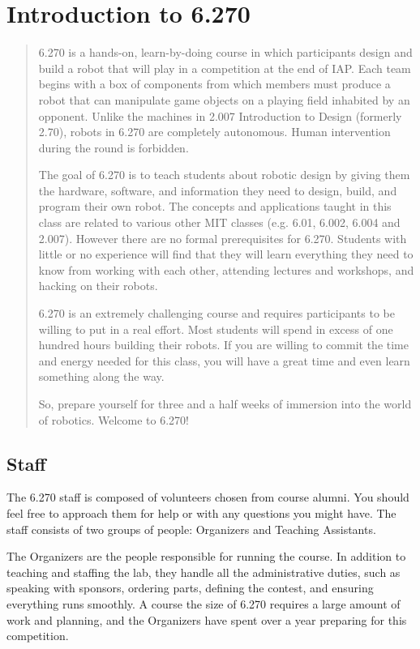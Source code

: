 
\chapter{Introduction to 6.270}
\begin{quote}
6.270 is a hands-on, learn-by-doing course in which participants design and
build a robot that will play in a competition at the end of IAP. Each team
begins with a box of components from which members must produce a robot that can
manipulate game objects on a playing field inhabited by an opponent. Unlike the
machines in 2.007 Introduction to Design (formerly 2.70), robots in 6.270 are
completely autonomous.  Human intervention during the round is forbidden.

The goal of 6.270 is to teach students about robotic design by giving them the
hardware, software, and information they need to design, build, and program
their own robot. The concepts and applications taught in this class are related
to various other MIT classes (e.g. 6.01, 6.002, 6.004 and 2.007). However there are
no formal prerequisites for 6.270. Students with little or no experience will
find that they will learn everything they need to know from working with each
other, attending lectures and workshops, and hacking on their robots.

6.270 is an extremely challenging course and requires participants to be willing to
put in a real effort. Most students will spend in excess of one hundred hours
building their robots. If you are willing to commit the time and energy needed
for this class, you will have a great time and even learn something along the
way.

So, prepare yourself for three and a half weeks of immersion into the world of
robotics. Welcome to 6.270!
\end{quote}


\section{Staff}

The 6.270 staff is composed of volunteers chosen from course alumni.  You should
feel free to approach them for help or with any questions you might
have. The staff consists of two groups of people: Organizers and Teaching
Assistants.

The Organizers are the people responsible for running the course. In addition to
teaching and staffing the lab, they handle all the administrative duties, such
as speaking with sponsors, ordering parts, defining the contest, and ensuring
everything runs smoothly. A course the size of 6.270 requires a large amount of
work and planning, and the Organizers have spent over a year preparing for this
competition.

